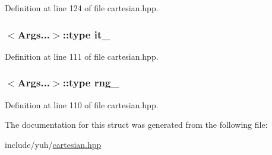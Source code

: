 \-Definition at line 124 of file cartesian.\-hpp.

\hypertarget{structyuh_1_1detail_1_1cartesian__iterator_a3be2fc4dce5bf688bebabf6767e81a80}{
\subsubsection[{it\-\_\-}]{$<$\-Args...$>$\-::type {\bf it\-\_\-}}}\label{d4/dcb/structyuh_1_1detail_1_1cartesian__iterator_a3be2fc4dce5bf688bebabf6767e81a80}


\-Definition at line 111 of file cartesian.\-hpp.

\hypertarget{structyuh_1_1detail_1_1cartesian__iterator_ad2ccb094e1179a6053313017b093b100}{
\subsubsection[{rng\-\_\-}]{$<$\-Args...$>$\-::type {\bf rng\-\_\-}}}\label{d4/dcb/structyuh_1_1detail_1_1cartesian__iterator_ad2ccb094e1179a6053313017b093b100}


\-Definition at line 110 of file cartesian.\-hpp.



\-The documentation for this struct was generated from the following file\-:\begin{DoxyCompactItemize}
\item 
include/yuh/\hyperlink{cartesian_8hpp}{cartesian.\-hpp}\end{DoxyCompactItemize}
